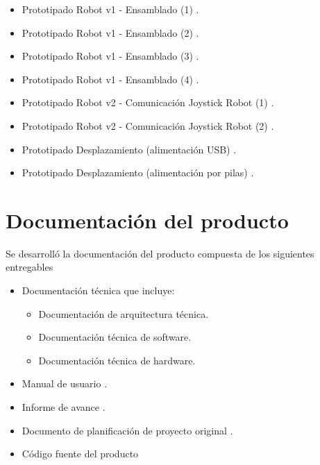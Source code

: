 \begin{itemize}
	\item Prototipado Robot v1 - Ensamblado (1) \cite{Prototipado_Ensamblado_1}.	
	\item Prototipado Robot v1 - Ensamblado (2) \cite{Prototipado_Ensamblado_2}.
	\item Prototipado Robot v1 - Ensamblado (3) \cite{Prototipado_Ensamblado_3}.
	\item Prototipado Robot v1 - Ensamblado (4) \cite{Prototipado_Ensamblado_4}.
	\item Prototipado Robot v2 - Comunicación Joystick Robot (1) \cite{Prototipado_Comunicacion_JoystickRobot1}.
	\item Prototipado Robot v2 - Comunicación Joystick Robot (2) \cite{Prototipado_Comunicacion_JoystickRobot2}.
	\item Prototipado Desplazamiento (alimentación USB) \cite{Prototipado_Desplazamiento_USB}.
	\item Prototipado Desplazamiento (alimentación por pilas) \cite{Prototipado_Desplazamiento_Pilas}.

\end{itemize}




\section{Documentación del producto }

Se desarrolló la documentación del producto compuesta de los siguientes entregables
\begin{itemize}
	\item Documentación técnica \cite{Robot_Tecnical_doc} que incluye:
	\begin{itemize}
		\item Documentación de arquitectura técnica.
		\item Documentación técnica de software.
		\item Documentación técnica de hardware.
	\end{itemize}
	\item Manual de usuario \cite{Robot_User_manual}.
	\item Informe de avance \cite{Robot_InformeAvance}.	
	\item Documento de planificación de proyecto original \cite{Robot_Planificacion}.
	\item Código fuente del producto \cite{Robot_SourceCode}
\end{itemize}











